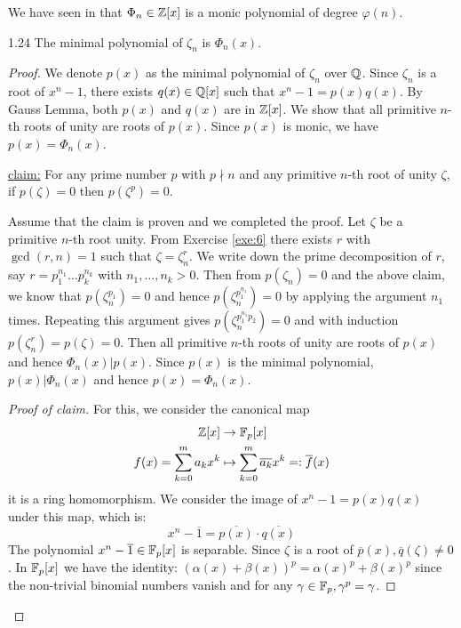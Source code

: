 \documentclass[twoside = false,	%
		headsepline,		%
		parskip = true,
		]{scrbook}						%
\begin{document}
        We have seen in \cite{Cobra} that $\Phi_n \in \mathbb Z[x]$ is a monic polynomial of degree $\varphi(n)$.
        
        \begin{lemma}{}{1.24}
            The minimal polynomial of $\zeta_n$ is $\Phi_n(x)$.
        \end{lemma}
        
        \begin{proof}
            We denote $p(x)$ as the minimal polynomial of $\zeta_n$ over $\mathbb Q$. Since $\zeta_n$ is a root of $x^n - 1$, there exists $q(x) \in \mathbb Q[x]$ such that $x^n - 1 = p(x)q(x)$. By Gauss Lemma, both $p(x)$ and $q(x)$ are in $\mathbb Z[x]$. We show that all primitive $n$-th roots of unity are roots of $p(x)$. Since $p(x)$ is monic, we have $p(x) = \Phi_n(x)$.
            
            \underline{claim:}
                For any prime number $p$ with $p \nmid n$ and any primitive $n$-th root of unity $\zeta$, if $p(\zeta) = 0$ then $p\left(\zeta^p\right) = 0$.
                
            
            Assume that the claim is proven and we completed the proof. Let $\zeta$ be a primitive $n$-th root unity. From Exercise \ref{exe:6} there exists $r$ with $\gcd(r,n) = 1$ such that $\zeta = \zeta_n^r$. We write down the prime decomposition of $r$, say $r = p_1^{n_1} \dots p_k^{n_k}$ with $n_1,\dots,n_k > 0$. Then from $p(\zeta_n) = 0$ and the above claim, we know that $p\left(\zeta_n^{p_1}\right) = 0$ and hence $p\left(\zeta_n^{p_1^{n_1}}\right) = 0$ by applying the argument $n_1$ times. Repeating this argument gives $p\left(\zeta_n^{p_1^{n_1}p_2}\right) = 0$ and with induction $p\left(\zeta_n^r\right) = p(\zeta) = 0$. Then all primitive $n$-th roots of unity are roots of $p(x)$ and hence $\Phi_n(x) | p(x)$. Since $p(x)$ is the minimal polynomial, $p(x) | \Phi_n(x)$ and hence $p(x) = \Phi_n(x)$.
            
            \begin{proof}[Proof of claim]
                For this, we consider the canonical map
                \begin{equation*}
                    \begin{split}
                    \mathbb Z[x] &\rightarrow \mathbb F_p[x] \\        f(x) = \sum_{k=0}^{m} a_k x^k  &\mapsto \sum_{k=0}^m \overline{a_k}x^k =: \overline{f}(x)
                    \end{split} 
                \end{equation*}
                it is a ring homomorphism. We consider the image of $x^n - 1 = p(x)q(x)$ under this map, which is:
                \begin{equation*}
                    x^n - \overline{1} = \overline{p(x)} \cdot \overline{q(x)}
                \end{equation*}
                The polynomial $x^n - \overline{1} \in \mathbb F_p[x]$ is separable. Since $\zeta$ is a root of $\overline{p}(x), \overline{q}(\zeta) \neq 0$.
                In $\mathbb F_p[x]$ we have the identity: $(\alpha(x) + \beta(x))^p = \alpha(x)^p + \beta(x)^p$ since the non-trivial binomial numbers vanish and for any $\gamma \in \mathbb F_p, \gamma^p = \gamma$.
                

\end{proof}
\end{proof}
\end{document}

